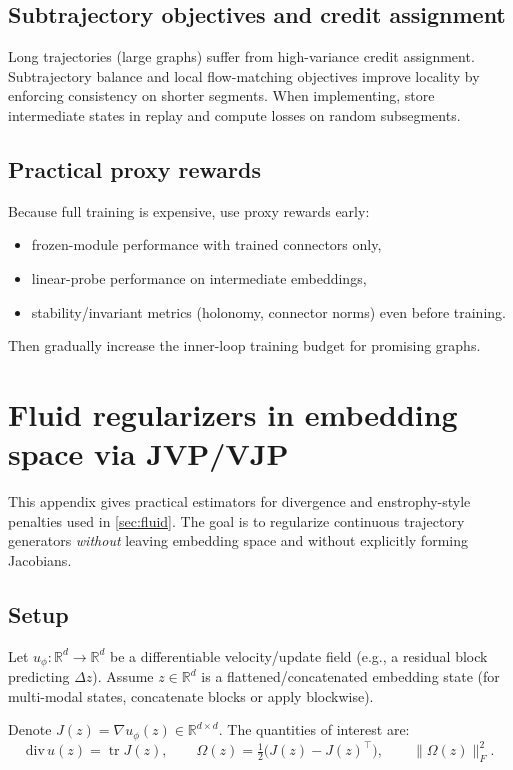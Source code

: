 \documentclass[11pt]{article}
\theoremstyle{definition}
\theoremstyle{plain}
\theoremstyle{remark}
\newcommand{\R}{\mathbb{R}}
\newcommand{\tr}{\operatorname{tr}}
\begin{document}
\subsection{Subtrajectory objectives and credit assignment}
Long trajectories (large graphs) suffer from high-variance credit assignment.
Subtrajectory balance and local flow-matching objectives improve locality by enforcing consistency on shorter segments.
When implementing, store intermediate states in replay and compute losses on random subsegments.

\subsection{Practical proxy rewards}
Because full training is expensive, use proxy rewards early:
\begin{itemize}[leftmargin=2em]
\item frozen-module performance with trained connectors only,
\item linear-probe performance on intermediate embeddings,
\item stability/invariant metrics (holonomy, connector norms) even before training.
\end{itemize}
Then gradually increase the inner-loop training budget for promising graphs.

\section{Fluid regularizers in embedding space via JVP/VJP}
\label{app:fluid}

This appendix gives practical estimators for divergence and enstrophy-style penalties used in \cref{sec:fluid}.
The goal is to regularize continuous trajectory generators \emph{without} leaving embedding space and without explicitly forming Jacobians.

\subsection{Setup}
Let $u_\phi:\R^{d}\to\R^{d}$ be a differentiable velocity/update field (e.g., a residual block predicting $\Delta z$).
Assume $z\in\R^{d}$ is a flattened/concatenated embedding state (for multi-modal states, concatenate blocks or apply blockwise).

Denote $J(z)=\nabla u_\phi(z)\in\R^{d\times d}$.
The quantities of interest are:
\[
\mathrm{div}\,u(z)=\tr J(z),\qquad
\Omega(z)=\tfrac12\bigl(J(z)-J(z)^\top\bigr),\qquad
\|\Omega(z)\|_F^2.
\]
\end{document}
